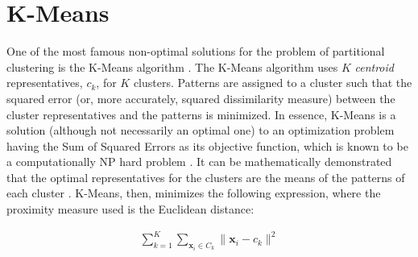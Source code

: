 


\section{K-Means}
\label{sec:kmeans}

One of the most famous non-optimal solutions for the problem of partitional clustering is the K-Means algorithm \cite{kmeansoriginal}.
The K-Means algorithm uses $K$ \emph{centroid} representatives, $c_k$, for $K$ clusters.
Patterns are assigned to a cluster such that the squared error (or, more accurately, squared dissimilarity measure) between the cluster representatives and the patterns is minimized.
In essence, K-Means is a solution (although not necessarily an optimal one) to an optimization problem having the Sum of Squared Errors as its objective function, which is known to be a computationally NP hard problem \cite{Jain2010}.
It can be mathematically demonstrated that the optimal representatives for the clusters are the means of the patterns of each cluster \cite{Aggarwal2014}.
K-Means, then, minimizes the following expression, where the proximity measure used is the Euclidean distance:

\begin{align}
    \sum^K_{k=1} \sum_{\mathbf{x}_i \in C_k} \| \mathbf{x}_i - c_k  \| ^2  \label{eq:sse}
\end{align}

